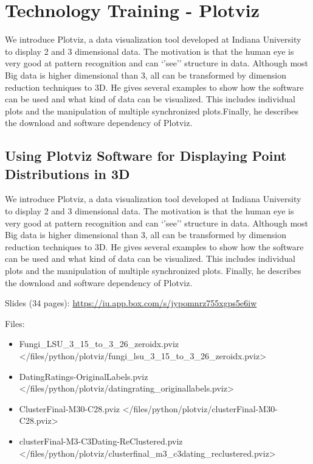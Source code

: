 \begin{fileremark}\currfiledir \currfilename\end{fileremark}


\section{Technology Training -
Plotviz}\label{technology-training---plotviz}

We introduce Plotviz, a data visualization tool developed at Indiana
University to display 2 and 3 dimensional data. The motivation is that
the human eye is very good at pattern recognition and can `'see''
structure in data. Although most Big data is higher dimensional than 3,
all can be transformed by dimension reduction techniques to 3D. He gives
several examples to show how the software can be used and what kind of
data can be visualized. This includes individual plots and the
manipulation of multiple synchronized plots.Finally, he describes the
download and software dependency of Plotviz.

\subsection{Using Plotviz Software for Displaying Point Distributions in
3D}\label{using-plotviz-software-for-displaying-point-distributions-in-3d}

We introduce Plotviz, a data visualization tool developed at Indiana
University to display 2 and 3 dimensional data. The motivation is that
the human eye is very good at pattern recognition and can `'see''
structure in data. Although most Big data is higher dimensional than 3,
all can be transformed by dimension reduction techniques to 3D. He gives
several examples to show how the software can be used and what kind of
data can be visualized. This includes individual plots and the
manipulation of multiple synchronized plots. Finally, he describes the
download and software dependency of Plotviz.

Slides (34 pages): \url{https://iu.app.box.com/s/jypomnrz755xgps5e6iw}

Files:

\begin{itemize}
\tightlist
\item
  Fungi\_LSU\_3\_15\_to\_3\_26\_zeroidx.pviz \textless{}/files/python/plotviz/fungi\_lsu\_3\_15\_to\_3\_26\_zeroidx.pviz\textgreater{}
\item
  DatingRatings-OriginalLabels.pviz \textless{}/files/python/plotviz/datingrating\_originallabels.pviz\textgreater{}
\item
  ClusterFinal-M30-C28.pviz \textless{}/files/python/plotviz/clusterFinal-M30-C28.pviz\textgreater{}
\item
  clusterFinal-M3-C3Dating-ReClustered.pviz \textless{}/files/python/plotviz/clusterfinal\_m3\_c3dating\_reclustered.pviz\textgreater{}
\end{itemize}

